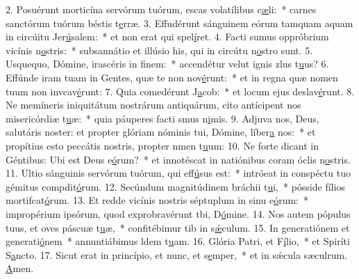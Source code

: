 2. Posuérunt morticína servórum tuórum, escas volatílibus c\uline{æ}li:~* carnes sanctórum tuórum béstis t\uline{e}rræ.
3. Effudérunt sánguinem eórum tamquam aquam in circúitu Jer\uline{ú}salem:~* et non erat qui spel\uline{í}ret.
4. Facti sumus oppróbrium vicínis n\uline{o}stris:~* subsannátio et illúsio his, qui in circútu n\uline{o}stro sunt.
5. Usquequo, Dómine, irascéris in f\uline{i}nem:~* accendétur velut ignis zlus t\uline{u}us?
6. Effúnde iram tuam in Gentes, quæ te non nov\uline{é}runt:~* et in regna quæ nomen tuum non invcav\uline{é}runt:
7. Quia comedérunt J\uline{a}cob:~* et locum ejus deslav\uline{é}runt.
8. Ne memíneris iniquitátum nostrárum antiquárum, cito antícipent nos misericórdiæ t\uline{u}æ:~* quia páuperes facti smus n\uline{i}mis.
9. Adjuva nos, Deus, salutáris noster: et propter glóriam nóminis tui, Dómine, líber\uline{a} nos:~* et propítius esto peccátis nostris, propter nmen t\uline{u}um:
10. Ne forte dicant in Géntibus: Ubi est Deus e\uline{ó}rum?~* et innotéscat in natiónibus coram óclis n\uline{o}stris.
11. Ultio sánguinis servórum tuórum, qui eff\uline{ú}sus est:~* intróeat in conspéctu tuo gémitus compdit\uline{ó}rum.
12. Secúndum magnitúdinem bráchii t\uline{u}i,~* pósside fílios mortifcat\uline{ó}rum.
13. Et redde vicínis nostris séptuplum in sinu e\uline{ó}rum:~* impropérium ipsórum, quod exprobravérunt tbi, D\uline{ó}mine.
14. Nos autem pópulus tuus, et oves páscuæ t\uline{u}æ,~* confitébimur tib in s\uline{ǽ}culum.
15. In generatiónem et generati\uline{ó}nem~* annuntiábimus ldem t\uline{u}am.
16. Glória Patri, et F\uline{í}lio,~* et Spiríti S\uline{a}ncto.
17. Sicut erat in princípio, et nunc, et s\uline{e}mper,~* et in sǽcula sæculrum. \uline{A}men.
